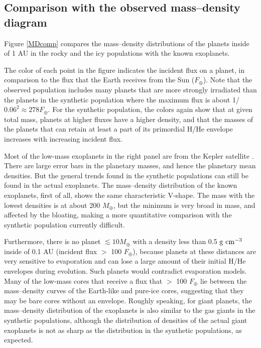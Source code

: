 \documentclass[]{emulateapj}
\def\mearth{M_{\oplus}}
\begin{document}
\subsection{Comparison with the observed mass--density diagram}
Figure \ref{MDcomp} compares the mass--density distributions of the planets inside of 1 AU in the rocky and the icy populations with the known exoplanets.

The color of each point in the figure indicates the incident flux on a planet, in comparison to the flux that the Earth receives from the Sun ($F_{\oplus}$). Note that the observed population includes many planets that are more strongly irradiated than the planets in the synthetic population where the maximum flux is about 1/$0.06^{2}\approx278 F_{\oplus}$. For the synthetic population, the colors again show that at given total mass, planets at higher fluxes have a higher density, and that the masses of the planets that can retain at least a part of its primordial H/He envelope increases with increasing incident flux. 

Most of the low-mass exoplanets in the right panel are from the Kepler satellite \citep{Marcy2014,Lissauer2013}. There are large error bars in the planetary masses, and hence the planetary mean densities. But the general trends found in the synthetic populations can still be found in the actual exoplanets. The mass--density distribution of the known exoplanets, first of all,  shows the same {characteristic} V-shape.  The mass with the lowest densities is at about 200 $\mearth$, but the minimum is very broad in mass, and affected by the bloating, making a more quantitative comparison with the synthetic population currently difficult.  

Furthermore, there is no planet $\lesssim10\mearth$ with a density less than 0.5 ${\rm g}~ {\rm cm}^{-3}$ inside of 0.1 AU (incident flux $>$ 100 $F_{\oplus}$), because planets at these distances are very sensitive to evaporation and can lose a large amount of their initial H/He envelopes during evolution. Such planets would contradict evaporation models. Many of the low-mass cores that receive a flux that $>$ 100 $F_{\oplus}$ lie between the mass--density curves of the Earth-like and pure-ice cores, suggesting that they may be bare cores without an envelope.
Roughly speaking, for giant planets, the mass--density distribution of the exoplanets is also similar to the gas giants in the synthetic  populations, although the distribution of densities of the actual giant exoplanets is not as sharp as the distribution in the synthetic populations, as expected.  
\end{document}
